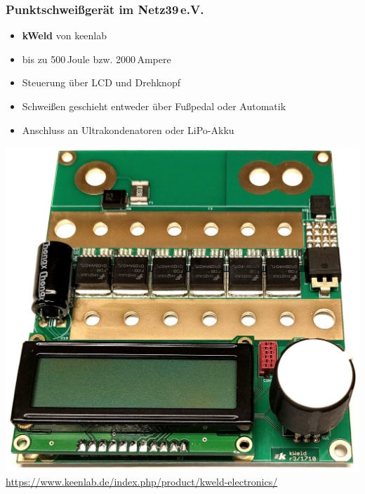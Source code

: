 \documentclass[handout, usenames,dvipsnames, nosymbols,aspectratio=169]{beamer}
\begin{document}
	\begin{frame}
		\frametitle{Punktschweißgerät im Netz39\,e.V.}
		\begin{minipage}{0.5\textwidth}	
			\begin{itemize}
				\item \textbf{kWeld} von keenlab
				\item bis zu 500\,Joule bzw. 2000\,Ampere
				\item Steuerung über LCD und Drehknopf
				\item Schweißen geschieht entweder über Fußpedal oder Automatik
				\item Anschluss an Ultrakondenatoren oder LiPo-Akku
			\end{itemize}
		\end{minipage}
		\begin{minipage}{0.45\textwidth}
			\includegraphics[width=\textwidth]{images/kWeld-electronics.jpg}
			\tiny
			{\color{gray}\url{https://www.keenlab.de/index.php/product/kweld-electronics/}}
		\end{minipage}
	\end{frame}
	
\end{document}
